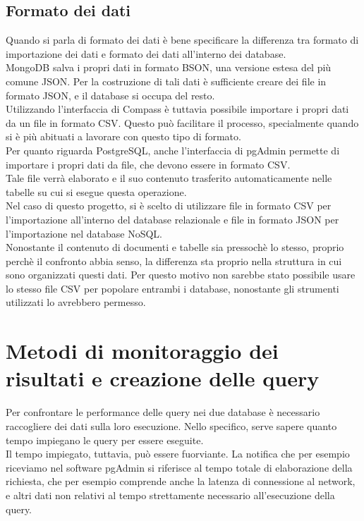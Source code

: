 \subsection{Formato dei dati}
Quando si parla di formato dei dati è bene specificare la differenza tra formato di importazione dei dati e formato dei dati all'interno dei database.\\
MongoDB salva i propri dati in formato BSON, una versione estesa del più comune JSON. Per la costruzione di tali dati è sufficiente creare dei file in formato JSON, e il database si occupa del resto.\\
Utilizzando l'interfaccia di Compass è tuttavia possibile importare i propri dati da un file in formato CSV. Questo può facilitare il processo, specialmente quando si è più abituati a lavorare con questo tipo di formato.\\
Per quanto riguarda PostgreSQL, anche l'interfaccia di pgAdmin permette di importare i propri dati da file, che devono essere in formato CSV.\\
Tale file verrà elaborato e il suo contenuto trasferito automaticamente nelle tabelle su cui si esegue questa operazione.\\

\noindent Nel caso di questo progetto, si è scelto di utilizzare file in formato CSV per l'importazione all'interno del database relazionale e file in formato JSON per l'importazione nel database NoSQL.\\
Nonostante il contenuto di documenti e tabelle sia pressochè lo stesso, proprio perchè il confronto abbia senso, la differenza sta proprio nella struttura in cui sono organizzati questi dati. Per questo motivo non sarebbe stato possibile usare lo stesso file CSV per popolare entrambi i database, nonostante gli strumenti utilizzati lo avrebbero permesso.\\

\section{Metodi di monitoraggio dei risultati e creazione delle query}
Per confrontare le performance delle query nei due database è necessario raccogliere dei dati sulla loro esecuzione. Nello specifico, serve sapere quanto tempo impiegano le query per essere eseguite.\\
Il tempo impiegato, tuttavia, può essere fuorviante. La notifica che per esempio riceviamo nel software pgAdmin si riferisce al tempo totale di elaborazione della richiesta, che per esempio comprende anche la latenza di connessione al network, e altri dati non relativi al tempo strettamente necessario all'esecuzione della query.\\

